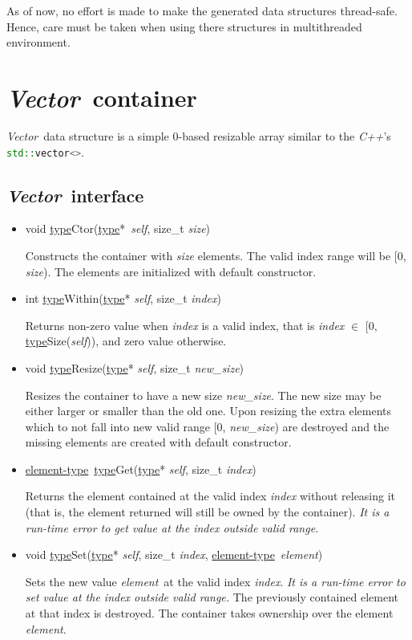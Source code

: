 \documentclass[a4paper]{article}
\newcommand{\Cpp}{\emph{C++}}
\newcommand{\st}{\underline{type}}
\newcommand{\et}{\underline{element-type}}
\newcommand{\sv}{\emph{self}}
\newcommand{\ev}{\emph{element}}
\newcommand{\meth}[1]{#1}
\begin{document}
As of now, no effort is made to make the generated data structures thread-safe.
Hence, care must be taken when using there structures in multithreaded environment.




\newcommand{\Vector}{\emph{Vector}}
\section{\Vector\ container}


\Vector\ data structure is a simple 0-based resizable array similar to the \Cpp's \lstinline[language=C++]{std::vector<>}.


\subsection{\Vector\ interface}


\begin{itemize}


\item \meth{void \st Ctor(\st*\ \sv, size\_t \emph{size})}


Constructs the container with \emph{size} elements.
The valid index range will be [0, \emph{size}).
The elements are initialized with default constructor.


\commonmethods


\item \meth{int \st Within(\st* \sv, size\_t \emph{index})}


Returns non-zero value when \emph{index} is a valid index, that is \emph{index} $\in$ [0, \meth{\st Size(\sv)}), and zero value otherwise.


\item \meth{void \st Resize(\st* \sv, size\_t \emph{new\_size})}


Resizes the container to have a new size \emph{new\_size}.
The new size may be either larger or smaller than the old one.
Upon resizing the extra elements which to not fall into new valid range [0, \emph{new\_size}) are destroyed and the missing elements are created with default constructor.


\item \meth{\et\ \st Get(\st* \sv, size\_t \emph{index})}


Returns the element contained at the valid index \emph{index} without releasing it (that is, the element returned will still be owned by the container).
\emph{It is a run-time error to get value at the index outside valid range.}


\item \meth{void \st Set(\st* \sv, size\_t \emph{index}, \et\ \ev)}


Sets the new value \ev\ at the valid index \emph{index}.
\emph{It is a run-time error to set value at the index outside valid range.}
The previously contained element at that index is destroyed.
The container takes ownership over the element \ev.


\end{itemize}
\end{document}
